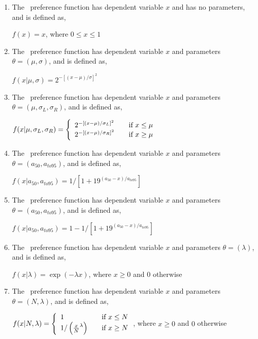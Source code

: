 \begin{enumerate}
\item The \ preference function has dependent variable $x$ and has no parameters, and is defined as,

$f(x)=x$, where $0 \leq x \leq 1$

\item The \ preference function has dependent variable $x$ and parameters $\theta = (\mu,\sigma)$, and is defined as, 

$f(x | \mu, \sigma) = 2^{-[(x- \mu)/\sigma ]^2} $
 
\item The \ preference function has dependent variable $x$ and parameters $\theta=(\mu,\sigma_L,\sigma_R)$, and is defined as,

$f(x | \mu, \sigma_L, \sigma_R) = \left\{ 
\begin{array}{l l}
  2^{-[(x- \mu)/\sigma_L ]^2} & \quad \mbox{if $x \leq \mu$}\\
  2^{-[(x- \mu)/\sigma_R ]^2} & \quad \mbox{if $x \ge \mu$}\\
\end{array} \right.$ 

\item The \ preference function has dependent variable $x$ and parameters $\theta = (a_{50},a_{to95})$, and is defined as,

$f(x | a_{50}, a_{to95}) = 1 / [1+19^{(a_{50}-x)/a_{to95}}]$

\item The \ preference function has dependent variable $x$ and parameters $\theta = (a_{50},a_{to95})$, and is defined as,

$f(x | a_{50}, a_{to95}) =1- 1 / [1+19^{(a_{50}-x)/a_{to95}}]$

\item The \ preference function has dependent variable $x$ and parameters $\theta = (\lambda)$, and is defined as,

$f(x | \lambda) =\exp(-\lambda x)$, where $x \geq 0$ and $0$ otherwise

\item The \ preference function has dependent variable $x$ and parameters $\theta = (N,\lambda)$, and is defined as,

$f(x | N, \lambda) = \left\{ 
\begin{array}{l l}
  1 & \quad \mbox{if $x \leq N$}\\
  1/\left({\frac{x}{N}}^\lambda\right) & \quad \mbox{if $x \ge N$}\\
\end{array} \right. $, where $x \geq 0$ and $0$ otherwise

\end{enumerate}

